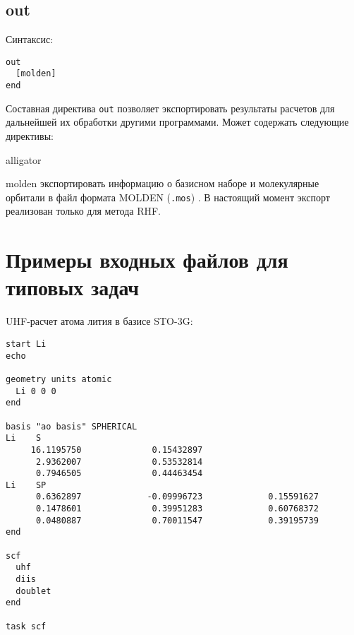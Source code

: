\documentclass[a4paper, 12pt]{article}
\begin{document}
\subsection{out}

Синтаксис:

\begin{lstlisting}
out
  [molden]
end
\end{lstlisting}

Составная директива \texttt{out} позволяет экспортировать результаты расчетов для дальнейшей их обработки другими программами. Может содержать следующие директивы:

\begin{labeling}{alligator}
\item [molden] экспортировать информацию о базисном наборе и молекулярные орбитали в файл формата MOLDEN (\texttt{.mos}) \cite{molden2000,molden2017,MoldenFormat}. В настоящий момент экспорт реализован только для метода RHF.
\end{labeling}

\section{Примеры входных файлов для типовых задач}\label{sec:examples}

UHF-расчет атома лития в базисе STO-3G:
\begin{lstlisting}
start Li
echo

geometry units atomic
  Li 0 0 0
end

basis "ao basis" SPHERICAL
Li    S
     16.1195750              0.15432897       
      2.9362007              0.53532814       
      0.7946505              0.44463454       
Li    SP
      0.6362897             -0.09996723             0.15591627       
      0.1478601              0.39951283             0.60768372       
      0.0480887              0.70011547             0.39195739       
end

scf
  uhf
  diis
  doublet
end

task scf
\end{lstlisting}

\bigskip
\end{document}

